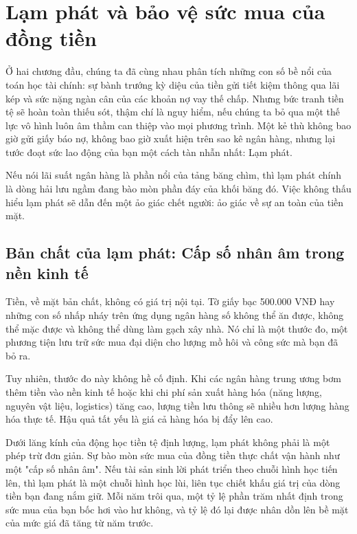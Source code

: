\documentclass[14pt, a4paper, oneside]{extreport}
\begin{document}
\chapter{Lạm phát và bảo vệ sức mua của đồng tiền}

Ở hai chương đầu, chúng ta đã cùng nhau phân tích những con số bề nổi của toán học tài chính: sự bành trướng kỳ diệu của tiền gửi tiết kiệm thông qua lãi kép và sức nặng ngàn cân của các khoản nợ vay thế chấp. Nhưng bức tranh tiền tệ sẽ hoàn toàn thiếu sót, thậm chí là nguy hiểm, nếu chúng ta bỏ qua một thế lực vô hình luôn âm thầm can thiệp vào mọi phương trình. Một kẻ thù không bao giờ gửi giấy báo nợ, không bao giờ xuất hiện trên sao kê ngân hàng, nhưng lại tước đoạt sức lao động của bạn một cách tàn nhẫn nhất: Lạm phát.

Nếu nói lãi suất ngân hàng là phần nổi của tảng băng chìm, thì lạm phát chính là dòng hải lưu ngầm đang bào mòn phần đáy của khối băng đó. Việc không thấu hiểu lạm phát sẽ dẫn đến một ảo giác chết người: ảo giác về sự an toàn của tiền mặt.

\section{Bản chất của lạm phát: Cấp số nhân âm trong nền kinh tế}

Tiền, về mặt bản chất, không có giá trị nội tại. Tờ giấy bạc 500.000 VNĐ hay những con số nhấp nháy trên ứng dụng ngân hàng số không thể ăn được, không thể mặc được và không thể dùng làm gạch xây nhà. Nó chỉ là một thước đo, một phương tiện lưu trữ sức mua đại diện cho lượng mồ hôi và công sức mà bạn đã bỏ ra.

Tuy nhiên, thước đo này không hề cố định. Khi các ngân hàng trung ương bơm thêm tiền vào nền kinh tế hoặc khi chi phí sản xuất hàng hóa (năng lượng, nguyên vật liệu, logistics) tăng cao, lượng tiền lưu thông sẽ nhiều hơn lượng hàng hóa thực tế. Hậu quả tất yếu là giá cả hàng hóa bị đẩy lên cao. 

Dưới lăng kính của động học tiền tệ định lượng, lạm phát không phải là một phép trừ đơn giản. Sự bào mòn sức mua của đồng tiền thực chất vận hành như một "cấp số nhân âm". Nếu tài sản sinh lời phát triển theo chuỗi hình học tiến lên, thì lạm phát là một chuỗi hình học lùi, liên tục chiết khấu giá trị của dòng tiền bạn đang nắm giữ. Mỗi năm trôi qua, một tỷ lệ phần trăm nhất định trong sức mua của bạn bốc hơi vào hư không, và tỷ lệ đó lại được nhân dồn lên bề mặt của mức giá đã tăng từ năm trước.
\end{document}
